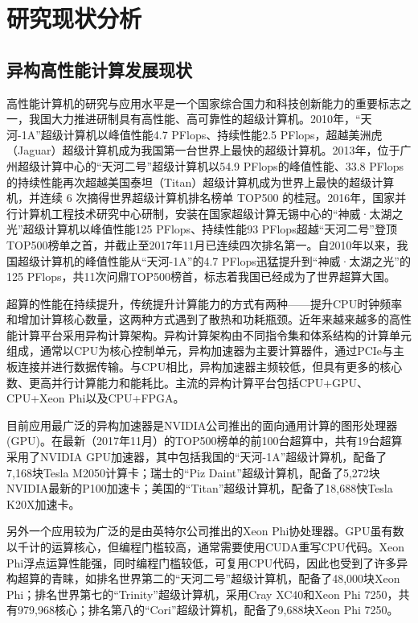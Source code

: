 \chapter{研究现状分析}
\label{ch:研究现状分析}

\section{异构高性能计算发展现状}
高性能计算机的研究与应用水平是一个国家综合国力和科技创新能力的重要标志之一，我国大力推进研制具有高性能、高可靠性的超级计算机。2010年，“天河-1A”\cite{yang2011tianhe}超级计算机以峰值性能4.7 PFlops、持续性能2.5 PFlops，超越美洲虎（Jaguar）超级计算机成为我国第一台世界上最快的超级计算机。2013年，位于广州超级计算中心的“天河二号”超级计算机\cite{liao2014milkyway}以54.9 PFlops的峰值性能、33.8 PFlops的持续性能再次超越美国泰坦（Titan）超级计算机成为世界上最快的超级计算机，并连续 6 次摘得世界超级计算机排名榜单 TOP500 的桂冠。2016年，国家并行计算机工程技术研究中心研制，安装在国家超级计算无锡中心的“神威·太湖之光”\cite{fu2016sunway}超级计算机以峰值性能125 PFlops、持续性能93 PFlops超越“天河二号”登顶TOP500榜单之首，并截止至2017年11月已连续四次排名第一。自2010年以来，我国超级计算机的峰值性能从“天河-1A”的4.7 PFlops迅猛提升到“神威·太湖之光”的125 PFlops，共11次问鼎TOP500榜首，标志着我国已经成为了世界超算大国。

超算的性能在持续提升，传统提升计算能力的方式有两种——提升CPU时钟频率和增加计算核心数量，这两种方式遇到了散热和功耗瓶颈。近年来越来越多的高性能计算平台采用异构计算架构\cite{buyya1999high}。异构计算架构由不同指令集和体系结构的计算单元组成，通常以CPU为核心控制单元，异构加速器为主要计算器件，通过PCIe与主板连接并进行数据传输。与CPU相比，异构加速器主频较低，但具有更多的核心数、更高并行计算能力和能耗比\cite{hong2010integrated}。主流的异构计算平台包括CPU+GPU、CPU+Xeon Phi以及CPU+FPGA。

目前应用最广泛的异构加速器是NVIDIA公司推出的面向通用计算的图形处理器\cite{nvidia2008programming}(GPU)。在最新（2017年11月）的TOP500榜单的前100台超算中，共有19台超算采用了NVIDIA GPU加速器，其中包括我国的“天河-1A”超级计算机，配备了7,168块Tesla M2050计算卡；瑞士的“Piz Daint”超级计算机\cite{PIZDAINT}，配备了5,272块NVIDIA最新的P100加速卡；美国的“Titan”超级计算机\cite{shimpi2012inside}，配备了18,688快Tesla K20X加速卡。

另外一个应用较为广泛的是由英特尔公司推出的Xeon Phi协处理器\cite{jeffers2013intel}。GPU虽有数以千计的运算核心，但编程门槛较高，通常需要使用CUDA\cite{cook2012cuda}重写CPU代码。Xeon Phi浮点运算性能强，同时编程门槛较低，可复用CPU代码，因此也受到了许多异构超算的青睐，如排名世界第二的“天河二号”超级计算机，配备了48,000块Xeon Phi\cite{liao2014milkyway}；排名世界第七的“Trinity”超级计算机\cite{Trinity}，采用Cray XC40和Xeon Phi 7250，共有979,968核心；排名第八的“Cori”超级计算机\cite{doerfler2018evaluating}，配备了9,688块Xeon Phi 7250。

